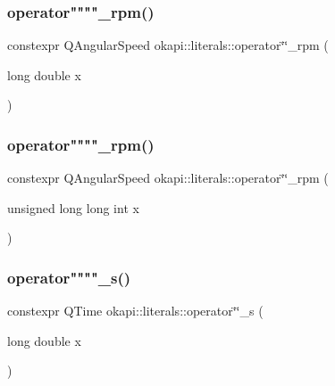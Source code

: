 \mbox{\label{namespaceokapi_1_1literals_a32709f66612c6f9e966cab17d6a6759e}} 
\subsubsection{\texorpdfstring{operator""""\_rpm()}{operator""\_rpm()}\hspace{0.1cm}{\footnotesize\ttfamily [1/2]}}
{\footnotesize\ttfamily constexpr Q\+Angular\+Speed okapi\+::literals\+::operator\char`\"{}\char`\"{}\+\_\+rpm (\begin{DoxyParamCaption}\item[{long double}]{x }\end{DoxyParamCaption})}

\mbox{\label{namespaceokapi_1_1literals_ab872fb0eb201af57679cd55f89362d0c}} 
\subsubsection{\texorpdfstring{operator""""\_rpm()}{operator""\_rpm()}\hspace{0.1cm}{\footnotesize\ttfamily [2/2]}}
{\footnotesize\ttfamily constexpr Q\+Angular\+Speed okapi\+::literals\+::operator\char`\"{}\char`\"{}\+\_\+rpm (\begin{DoxyParamCaption}\item[{unsigned long long int}]{x }\end{DoxyParamCaption})}

\mbox{\label{namespaceokapi_1_1literals_aa500acbe38f044a8d9980f705046918c}} 
\subsubsection{\texorpdfstring{operator""""\_s()}{operator""\_s()}\hspace{0.1cm}{\footnotesize\ttfamily [1/2]}}
{\footnotesize\ttfamily constexpr Q\+Time okapi\+::literals\+::operator\char`\"{}\char`\"{}\+\_\+s (\begin{DoxyParamCaption}\item[{long double}]{x }\end{DoxyParamCaption})}

